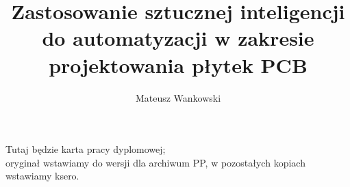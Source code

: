 \documentclass[polish,a4paper,oneside]{ppfcmthesis}
\author{%
   Mateusz Wankowski \album{136823}}
\title{Zastosowanie sztucznej inteligencji\\do automatyzacji w zakresie\\projektowania płytek PCB}
\begin{document}
\frontmatter\pagestyle{empty}%
\maketitle\cleardoublepage%


\thispagestyle{empty}\vspace*{\fill}%
\begin{center}Tutaj będzie karta pracy dyplomowej;\\oryginał wstawiamy do wersji dla archiwum PP, w pozostałych kopiach wstawiamy ksero.\end{center}%
\vfill\cleardoublepage%


\pagestyle{ppfcmthesis}%
\tableofcontents* 
\cleardoublepage %


\mainmatter%









{\raggedright\sloppy\small}


%


\ppcolophon
\end{document}
